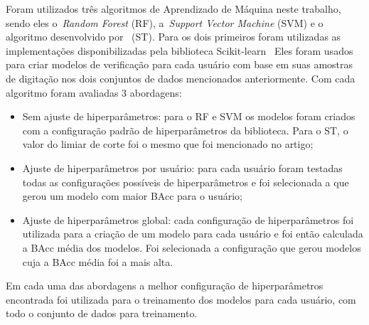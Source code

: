Foram utilizados três algoritmos de Aprendizado de Máquina neste trabalho, sendo eles o~\textit{Random Forest} (RF), a~\textit{Support Vector Machine} (SVM) e o algoritmo desenvolvido por~ (ST). Para os dois primeiros foram utilizadas as implementações disponibilizadas pela biblioteca Scikit-learn~\cite{scikit-learn} Eles foram usados para criar modelos de verificação para cada usuário com base em suas amostras de digitação nos dois conjuntos de dados mencionados anteriormente. Com cada algoritmo foram avaliadas 3 abordagens:

\begin{itemize}
    \item Sem ajuste de hiperparâmetros: para o RF e SVM os modelos foram criados com a configuração padrão de hiperparâmetros da biblioteca. Para o ST, o valor do limiar de corte foi o mesmo que foi mencionado no artigo;
    \item Ajuste de hiperparâmetros por usuário: para cada usuário foram testadas todas as configurações possíveis de hiperparâmetros e foi selecionada a que gerou um modelo com maior BAcc para o usuário;
    \item Ajuste de hiperparâmetros global: cada configuração de hiperparâmetros foi utilizada para a criação de um modelo para cada usuário e foi então calculada a BAcc média dos modelos. Foi selecionada a configuração que gerou modelos cuja a BAcc média foi a mais alta. 
\end{itemize}

Em cada uma das abordagens a melhor configuração de hiperparâmetros encontrada foi utilizada para o treinamento dos modelos para cada usuário, com todo o conjunto de dados para treinamento.
